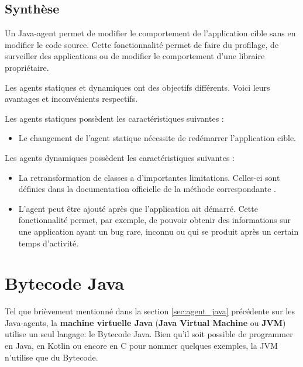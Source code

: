 \begin{minipage}{\linewidth}
\label{fig:cojac_dynamic_agent}
\end{minipage}

\subsection{Synthèse}

Un \gls{Java-agent} permet de modifier le comportement de l'application cible sans en modifier le code source. Cette fonctionnalité permet de faire du profilage, de surveiller des applications ou de modifier le comportement d'une libraire propriétaire.

Les agents statiques et dynamiques ont des objectifs différents. Voici leurs avantages et inconvénients respectifs.

Les agents statiques possèdent les caractéristiques suivantes :

\begin{itemize}
    \item Le changement de l'agent statique nécessite de redémarrer l'application cible.
\end{itemize}

Les agents dynamiques possèdent les caractéristiques suivantes :

\begin{itemize}
    \item La retransformation de classes a d'importantes limitations. Celles-ci sont définies dans la documentation officielle de la méthode correspondante \cite{java-instrumentation-retransform-documentation}.
    \item L'agent peut être ajouté après que l'application ait démarré. Cette fonctionnalité permet, par exemple, de pouvoir obtenir des informations sur une application ayant un bug rare, inconnu ou qui se produit après un certain temps d'activité.
\end{itemize}


\section{Bytecode Java}
\label{sec:bytecode}

Tel que brièvement mentionné dans la section \ref{sec:agent_java} précédente sur les \glspl{Java-agent}, la \textbf{machine virtuelle Java} (\textbf{Java Virtual Machine} ou \textbf{\gls{JVM}}) utilise un seul langage: le \gls{Bytecode} Java. Bien qu'il soit possible de programmer en Java, en Kotlin ou encore en C pour nommer quelques exemples, la \gls{JVM} n'utilise que du \gls{Bytecode}.

